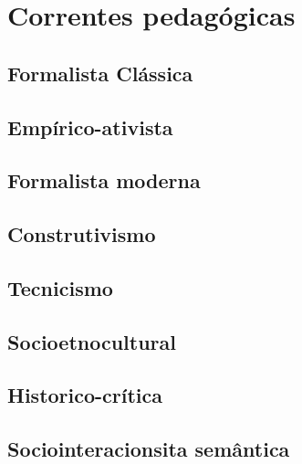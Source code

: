 \chapter{Correntes pedagógicas}
\section{Formalista Clássica}
\section{Empírico-ativista}
\section{Formalista moderna}
\section{Construtivismo}
\section{Tecnicismo}
\section{Socioetnocultural}
\section{Historico-crítica}
\section{Sociointeracionsita semântica}
